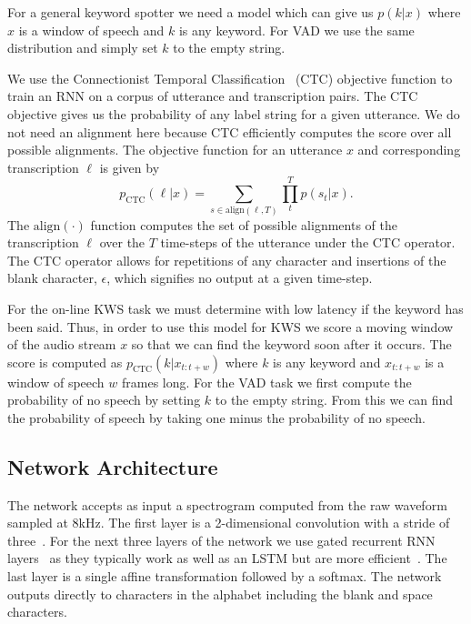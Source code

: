For a general keyword spotter we need a model which can give us $p(k | x)$
where $x$ is a window of speech and $k$ is any keyword. For VAD we use the same
distribution and simply set $k$ to the empty string.

We use the Connectionist Temporal Classification~\cite{graves2006} (CTC)
objective function to train an RNN on a corpus of utterance and transcription
pairs. The CTC objective gives us the probability of any label string for a
given utterance. We do not need an alignment here because CTC efficiently
computes the score over all possible alignments. The objective function for an
utterance $x$ and corresponding transcription $\ell$ is given by
\begin{equation}
p_{\mathrm{CTC}}(\ell | x) = \sum_{s \in \mathrm{align}(\ell, T)} \prod_t^T p(s_t | x).
\end{equation}
The $\mathrm{align}(\cdot)$ function computes the set of possible alignments of
the transcription $\ell$ over the $T$ time-steps of the utterance under the CTC
operator. The CTC operator allows for repetitions of any character and
insertions of the blank character, $\epsilon$, which signifies no output at a
given time-step.

For the on-line KWS task we must determine with low latency if the keyword has
been said. Thus, in order to use this model for KWS we score a moving window of
the audio stream $x$ so that we can find the keyword soon after it occurs. The
score is computed as $p_{\mathrm{CTC}}(k | x_{t:t+w})$ where $k$ is any keyword
and $x_{t:t+w}$ is a window of speech $w$ frames long. For the VAD task we
first compute the probability of no speech by setting $k$ to the empty string.
From this we can find the probability of speech by taking one minus the
probability of no speech.

\subsection{Network Architecture}
\label{sec:kws:architecture}

The network accepts as input a spectrogram computed from the raw waveform
sampled at 8kHz. The first layer is a 2-dimensional convolution with a stride
of three~\cite{amodei2016deep}. For the next three layers of the network we use
gated recurrent RNN layers~\cite{cho2014} as they typically work as well as an
LSTM but are more efficient~\cite{chung2014}. The last layer is a single affine
transformation followed by a softmax. The network outputs directly to
characters in the alphabet including the blank and space characters.

